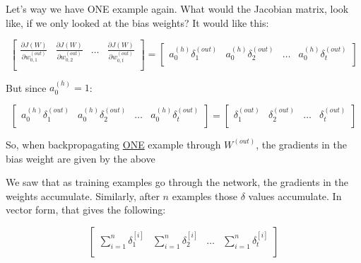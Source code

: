 \documentclass[../main.tex]{subfiles}
\begin{document}
Let's way we have ONE example again. What would the Jacobian matrix, look like, if we only looked at the bias weights?
It would like this:

\[
    \begin{bmatrix}
        \frac{\partial J(W)}{\partial w_{0,1}^{(out)}} & \frac{\partial J(W)}{\partial w_{0,2}^{(out)}} & \dots & \frac{\partial J(W)}{\partial w_{0,t}^{(out)}} \\
    \end{bmatrix}
    =
    \begin{bmatrix}
        a_0^{(h)} \delta_1^{(out)}  & a_0^{(h)} \delta_2^{(out)}    & \dots  & a_0^{(h)} \delta_t^{(out)}   \\
    \end{bmatrix}
\]

But since $a_0^{(h)} = 1$:

\[
    \begin{bmatrix}
        a_0^{(h)} \delta_1^{(out)}  & a_0^{(h)} \delta_2^{(out)}    & \dots  & a_0^{(h)} \delta_t^{(out)}   \\
    \end{bmatrix}
    =
    \begin{bmatrix}
        \delta_1^{(out)}  & \delta_2^{(out)}    & \dots  & \delta_t^{(out)}   \\
    \end{bmatrix}  
\]

So, when backpropagating \underline{ONE} example through $W^{(out)}$, the gradients in the bias weight are given by the above

\vspace{5mm} %

We saw that as training examples go through the network, the gradients in the weights accumulate. Similarly, after $n$ examples those $\delta$ values
accumulate. In vector form, that gives the following:

\vspace{5mm} %

\[
    \begin{bmatrix}
        \sum_{i=1}^{n}\delta_1^{[i]}  & \sum_{i=1}^{n}\delta_2^{[i]}    & \dots  & \sum_{i=1}^{n}\delta_t^{[i]}   \\
    \end{bmatrix}   
\]
\end{document}
